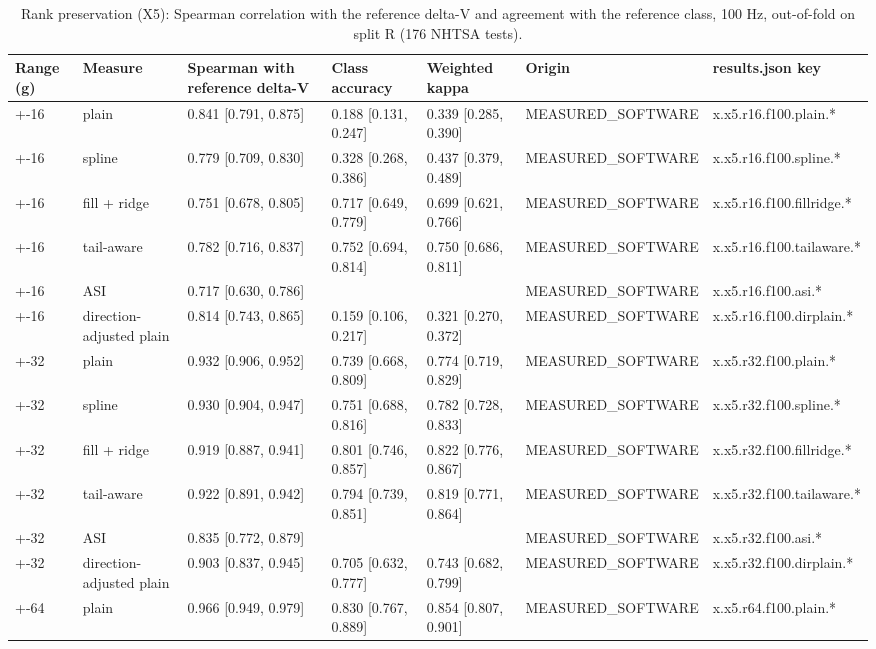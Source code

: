 \begin{table}[t]
\centering
\small
\caption{Rank preservation (X5): Spearman correlation with the reference delta-V and agreement with the reference class, 100 Hz, out-of-fold on split R (176 NHTSA tests).}
\label{tab:jp_tab_x5_rank}
\begin{tabular}{lllllll}
\toprule
Range (g) & Measure & Spearman with reference delta-V & Class accuracy & Weighted kappa & Origin & results.json key \\
\midrule
+-16 & plain & 0.841 [0.791, 0.875] & 0.188 [0.131, 0.247] & 0.339 [0.285, 0.390] & MEASURED\_SOFTWARE & x.x5.r16.f100.plain.* \\
+-16 & spline & 0.779 [0.709, 0.830] & 0.328 [0.268, 0.386] & 0.437 [0.379, 0.489] & MEASURED\_SOFTWARE & x.x5.r16.f100.spline.* \\
+-16 & fill + ridge & 0.751 [0.678, 0.805] & 0.717 [0.649, 0.779] & 0.699 [0.621, 0.766] & MEASURED\_SOFTWARE & x.x5.r16.f100.fillridge.* \\
+-16 & tail-aware & 0.782 [0.716, 0.837] & 0.752 [0.694, 0.814] & 0.750 [0.686, 0.811] & MEASURED\_SOFTWARE & x.x5.r16.f100.tailaware.* \\
+-16 & ASI & 0.717 [0.630, 0.786] &  &  & MEASURED\_SOFTWARE & x.x5.r16.f100.asi.* \\
+-16 & direction-adjusted plain & 0.814 [0.743, 0.865] & 0.159 [0.106, 0.217] & 0.321 [0.270, 0.372] & MEASURED\_SOFTWARE & x.x5.r16.f100.dirplain.* \\
+-32 & plain & 0.932 [0.906, 0.952] & 0.739 [0.668, 0.809] & 0.774 [0.719, 0.829] & MEASURED\_SOFTWARE & x.x5.r32.f100.plain.* \\
+-32 & spline & 0.930 [0.904, 0.947] & 0.751 [0.688, 0.816] & 0.782 [0.728, 0.833] & MEASURED\_SOFTWARE & x.x5.r32.f100.spline.* \\
+-32 & fill + ridge & 0.919 [0.887, 0.941] & 0.801 [0.746, 0.857] & 0.822 [0.776, 0.867] & MEASURED\_SOFTWARE & x.x5.r32.f100.fillridge.* \\
+-32 & tail-aware & 0.922 [0.891, 0.942] & 0.794 [0.739, 0.851] & 0.819 [0.771, 0.864] & MEASURED\_SOFTWARE & x.x5.r32.f100.tailaware.* \\
+-32 & ASI & 0.835 [0.772, 0.879] &  &  & MEASURED\_SOFTWARE & x.x5.r32.f100.asi.* \\
+-32 & direction-adjusted plain & 0.903 [0.837, 0.945] & 0.705 [0.632, 0.777] & 0.743 [0.682, 0.799] & MEASURED\_SOFTWARE & x.x5.r32.f100.dirplain.* \\
+-64 & plain & 0.966 [0.949, 0.979] & 0.830 [0.767, 0.889] & 0.854 [0.807, 0.901] & MEASURED\_SOFTWARE & x.x5.r64.f100.plain.* \\

\end{tabular}
\end{table}
